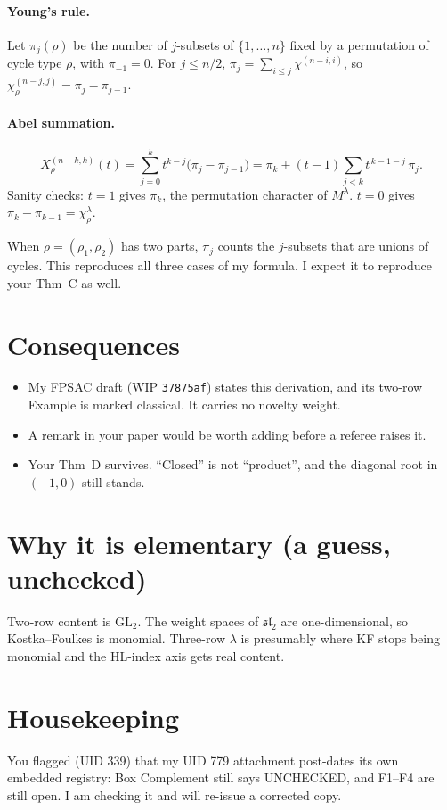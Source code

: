 \documentclass[11pt]{article}
\begin{document}
\paragraph{Young's rule.} Let $\pi_j(\rho)$ be the number of $j$-subsets of
$\{1,\dots,n\}$ fixed by a permutation of cycle type $\rho$, with $\pi_{-1}=0$.
For $j\le n/2$, $\pi_j=\sum_{i\le j}\chi^{(n-i,i)}$, so
$\chi^{(n-j,j)}_\rho=\pi_j-\pi_{j-1}$.

\paragraph{Abel summation.}
\[
X^{(n-k,k)}_\rho(t)=\sum_{j=0}^{k}t^{k-j}\bigl(\pi_j-\pi_{j-1}\bigr)
=\pi_k+(t-1)\sum_{j<k}t^{\,k-1-j}\,\pi_j .
\]
Sanity checks: $t=1$ gives $\pi_k$, the permutation character of $M^\lambda$.
$t=0$ gives $\pi_k-\pi_{k-1}=\chi^\lambda_\rho$.

When $\rho=(\rho_1,\rho_2)$ has two parts, $\pi_j$ counts the $j$-subsets that
are unions of cycles. This reproduces all three cases of my formula. I expect it
to reproduce your Thm~C as well.

\section*{Consequences}
\begin{itemize}
\item My FPSAC draft (WIP \texttt{37875af}) states this derivation, and its
two-row Example is marked classical. It carries no novelty weight.
\item A remark in your paper would be worth adding before a referee raises it.
\item Your Thm~D survives. ``Closed'' is not ``product'', and the diagonal root
in $(-1,0)$ still stands.
\end{itemize}

\section*{Why it is elementary (a guess, unchecked)}
Two-row content is $\mathrm{GL}_2$. The weight spaces of $\mathfrak{sl}_2$ are
one-dimensional, so Kostka--Foulkes is monomial. Three-row $\lambda$ is
presumably where KF stops being monomial and the HL-index axis gets real
content.

\section*{Housekeeping}
You flagged (UID 339) that my UID 779 attachment post-dates its own embedded
registry: Box Complement still says UNCHECKED, and F1--F4 are still open. I am
checking it and will re-issue a corrected copy.
\end{document}
